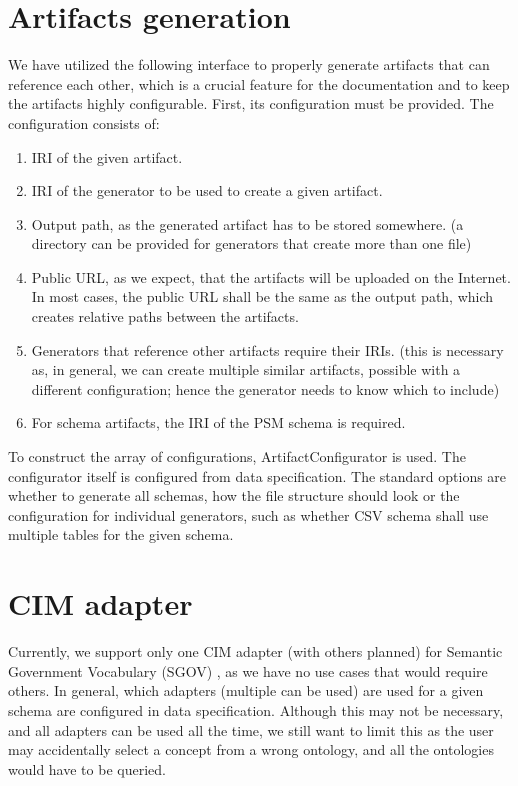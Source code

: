 \section{Artifacts generation}

We have utilized the following interface to properly generate artifacts that can reference each other, which is a crucial feature for the documentation and to keep the artifacts highly configurable. First, its configuration must be provided. The configuration consists of:

\begin{enumerate}
    \item IRI of the given artifact.
    \item IRI of the generator to be used to create a given artifact.
    \item Output path, as the generated artifact has to be stored somewhere. (a directory can be provided for generators that create more than one file)
    \item Public URL, as we expect, that the artifacts will be uploaded on the Internet. In most cases, the public URL shall be the same as the output path, which creates relative paths between the artifacts.
    \item Generators that reference other artifacts require their IRIs. (this is necessary as, in general, we can create multiple similar artifacts, possible with a different configuration; hence the generator needs to know which to include)
    \item For schema artifacts, the IRI of the PSM schema is required.
\end{enumerate}

To construct the array of configurations, ArtifactConfigurator is used. The configurator itself is configured from data specification. The standard options are whether to generate all schemas, how the file structure should look or the configuration for individual generators, such as whether CSV schema shall use multiple tables for the given schema.

\section{CIM adapter}

Currently, we support only one CIM adapter (with others planned) for Semantic Government Vocabulary (SGOV) \cite{kvremen2019improving}, as we have no use cases that would require others. In general, which adapters (multiple can be used) are used for a given schema are configured in data specification. Although this may not be necessary, and all adapters can be used all the time, we still want to limit this as the user may accidentally select a concept from a wrong ontology, and all the ontologies would have to be queried.

